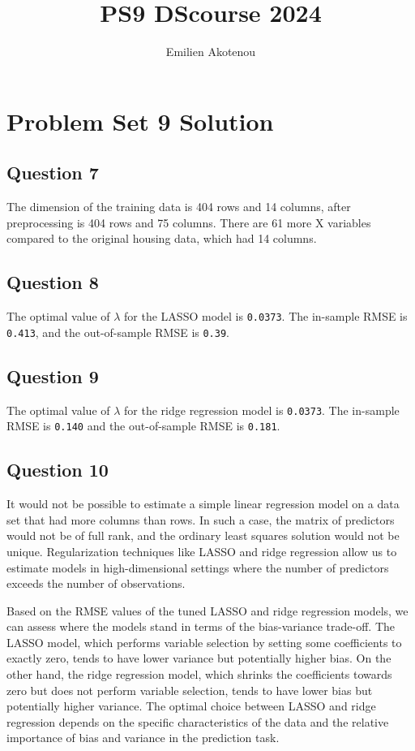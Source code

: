 \documentclass{article}
\title{PS9 DScourse 2024}
\author{Emilien Akotenou}
\begin{document}
\maketitle
\section*{Problem Set 9 Solution}

\subsection*{Question 7}
The dimension of the training data is 404 rows and 14 columns, after preprocessing is 404 rows and 75 columns. There are 61 more X variables compared to the original housing data, which had 14 columns.

\subsection*{Question 8}
The optimal value of $\lambda$ for the LASSO model is \texttt{0.0373}. The in-sample RMSE is \texttt{0.413}, and the out-of-sample RMSE is \texttt{0.39}.

\subsection*{Question 9}
The optimal value of $\lambda$ for the ridge regression model is \texttt{0.0373}. The in-sample RMSE is \texttt{0.140} and the out-of-sample RMSE is \texttt{0.181}.

\subsection*{Question 10}
It would not be possible to estimate a simple linear regression model on a data set that had more columns than rows. In such a case, the matrix of predictors would not be of full rank, and the ordinary least squares solution would not be unique. Regularization techniques like LASSO and ridge regression allow us to estimate models in high-dimensional settings where the number of predictors exceeds the number of observations.

Based on the RMSE values of the tuned LASSO and ridge regression models, we can assess where the models stand in terms of the bias-variance trade-off. The LASSO model, which performs variable selection by setting some coefficients to exactly zero, tends to have lower variance but potentially higher bias. On the other hand, the ridge regression model, which shrinks the coefficients towards zero but does not perform variable selection, tends to have lower bias but potentially higher variance. The optimal choice between LASSO and ridge regression depends on the specific characteristics of the data and the relative importance of bias and variance in the prediction task.
\end{document}
